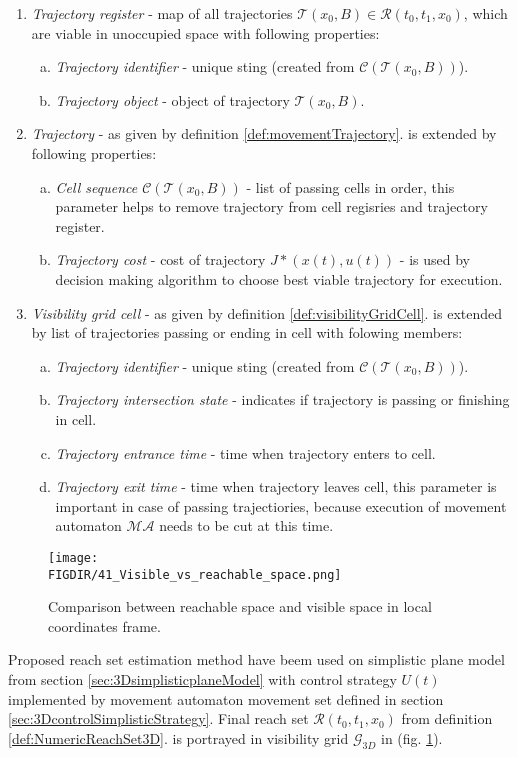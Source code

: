 \begin{enumerate}
    \item \textit{Trajectory register} - map of all trajectories $\mathscr{T}(x_0,B)\in\mathscr{R}(t_0,t_1,x_0)$, which are viable in unoccupied space with following properties:
    \begin{enumerate}[a.]
        \item \textit{Trajectory identifier} - unique sting (created from  $\mathscr{C}(\mathscr{T}(x_0,B))$). 
        \item \textit{Trajectory object} - object of trajectory $\mathscr{T}(x_0,B)$.
    \end{enumerate}
    \item \textit{Trajectory} - as given by definition \ref{def:movementTrajectory}. is extended by following properties:
    \begin{enumerate}[a.]
        \item \textit{Cell sequence $\mathscr{C}(\mathscr{T}(x_0,B))$} - list of passing cells in order, this parameter helps to remove trajectory from cell regisries and trajectory register.
        \item \textit{Trajectory cost} - cost of trajectory $J*(x(t),u(t))$ - is used by decision making algorithm to choose best viable trajectory for execution.
    \end{enumerate}
    \item \textit{Visibility grid cell} - as given by definition \ref{def:visibilityGridCell}. is extended by list of trajectories passing or ending in cell with folowing members:
    \begin{enumerate}[a.]
        \item \textit{Trajectory identifier} - unique sting (created from  $\mathscr{C}(\mathscr{T}(x_0,B))$).
        \item \textit{Trajectory intersection state} - indicates if trajectory is passing or finishing in cell.
        \item \textit{Trajectory entrance time} - time when trajectory enters to cell.
        \item \textit{Trajectory exit time} - time when trajectory leaves cell, this parameter is important in case of passing trajectiories, because execution of movement automaton $\mathscr{MA}$ needs to be cut at this time.
    \end{enumerate}
\end{enumerate}

\begin{figure}[H]
    \centering
    \texttt{[image: \\FIGDIR/41\_Visible\_vs\_reachable\_space.png]}
    \caption{Comparison between reachable space and visible space in local coordinates frame.}
    \label{fig:visibleVsReachableLocalFrame}
\end{figure}
\noindent Proposed reach set estimation method have beem used on simplistic plane model from section \ref{sec:3DsimplisticplaneModel} with control strategy $U(t)$ implemented by movement automaton movement set defined in section \ref{sec:3DcontrolSimplisticStrategy}. Final reach set $\mathscr{R}(t_0,t_1,x_0)$ from definition \ref{def:NumericReachSet3D}. is portrayed in visibility grid $\mathscr{G}_{3D}$ in (fig. \ref{fig:visibleVsReachableLocalFrame}).

